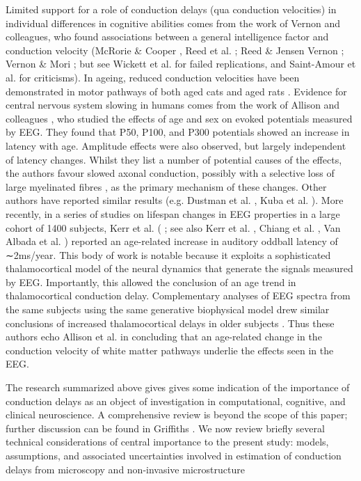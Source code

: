 Limited support for a role of conduction delays (qua conduction velocities) in individual differences in cognitive abilities comes from the work of Vernon and colleagues, who found associations between a general intelligence factor and conduction velocity (McRorie \& Cooper  \cite{mcrorie2004synaptic}, Reed et al. \cite{reed2004confirmation}; Reed \& Jensen \cite{reed1991arm,reed1992conduction,reed1993a}
Vernon \cite{vernon1983speed}; Vernon \& Mori \cite{vernon1992intelligence} ; but see Wickett et al. \cite{wickett1994peripheral} for failed replications, and Saint-Amour et al. \cite{saintamour2005can} for criticisms). In ageing, reduced conduction velocities have been demonstrated in motor pathways of both aged cats \cite{morales1987basic,xi1999changes} and aged rats \cite{astonjones1980brain}. Evidence for central nervous system slowing in humans comes from the work of Allison and colleagues \cite{allison1984developmental,allison1983brain}, who studied the effects of age and sex on evoked potentials measured by EEG. They found that P50, P100, and P300 potentials showed an increase in latency with age.  Amplitude effects were also observed, but largely independent of latency changes. Whilst they list a number of potential causes of the effects, the authors favour slowed axonal conduction, possibly with a selective loss of large myelinated fibres \cite{morrison1990aging}, as the primary mechanism of these changes. Other authors have reported similar results (e.g. Dustman et al. \cite{dustman1990age}, Kuba et al. \cite{kuba2012aging}). More recently, in a series of studies on lifespan changes in EEG properties in a large cohort of 1400 subjects, Kerr et al. (\cite{kerr2010age} 
; see also Kerr et al. \cite{kerr2011modelbased}, Chiang et al. \cite{chiang2011age}, Van Albada et al. \cite{vanalbada2010neurophysiological}) reported an age-related increase in auditory oddball latency of ∼2ms/year. This body of work is notable because it exploits a sophisticated thalamocortical model of the neural dynamics that generate the signals measured by EEG. Importantly, this allowed the conclusion of an age trend in thalamocortical conduction delay. Complementary analyses of EEG spectra from the same subjects using the same generative biophysical model drew similar conclusions of increased thalamocortical delays in older subjects \cite{vanalbada2010neurophysiological}. Thus these authors echo Allison et al.  \cite{allison1984developmental} in concluding that an age-related change in the conduction velocity of white matter pathways underlie the effects seen in the EEG. 

The research summarized above gives gives some indication of the importance of conduction delays as an object of investigation in computational, cognitive, and clinical neuroscience. A comprehensive review is beyond the scope of this paper; further discussion can be found in Griffiths \cite{griffiths2014the}. We now review briefly several technical considerations of central importance to the present study: models, assumptions, and associated uncertainties involved in estimation of conduction delays from microscopy and non-invasive microstructure 